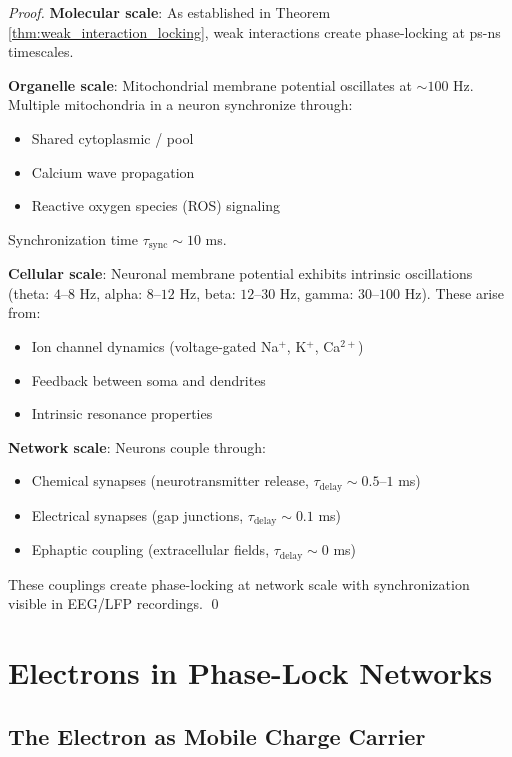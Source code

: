 \documentclass[11pt]{article}
\theoremstyle{remark}
\begin{document}
\begin{proof}
\textbf{Molecular scale}: As established in Theorem \ref{thm:weak_interaction_locking}, weak interactions create phase-locking at ps-ns timescales.

\textbf{Organelle scale}: Mitochondrial membrane potential oscillates at $\sim 100$ Hz. Multiple mitochondria in a neuron synchronize through:
\begin{itemize}
\item Shared cytoplasmic / pool
\item Calcium wave propagation
\item Reactive oxygen species (ROS) signaling
\end{itemize}
Synchronization time $\tau_{\text{sync}} \sim 10$ ms.

\textbf{Cellular scale}: Neuronal membrane potential exhibits intrinsic oscillations (theta: $4$--$8$ Hz, alpha: $8$--$12$ Hz, beta: $12$--$30$ Hz, gamma: $30$--$100$ Hz). These arise from:
\begin{itemize}
\item Ion channel dynamics (voltage-gated Na$^+$, K$^+$, Ca$^{2+}$)
\item Feedback between soma and dendrites
\item Intrinsic resonance properties
\end{itemize}

\textbf{Network scale}: Neurons couple through:
\begin{itemize}
\item Chemical synapses (neurotransmitter release, $\tau_{\text{delay}} \sim 0.5$--$1$ ms)
\item Electrical synapses (gap junctions, $\tau_{\text{delay}} \sim 0.1$ ms)
\item Ephaptic coupling (extracellular fields, $\tau_{\text{delay}} \sim 0$ ms)
\end{itemize}

These couplings create phase-locking at network scale with synchronization visible in EEG/LFP recordings. \qed
\end{proof}

\section{Electrons in Phase-Lock Networks}

\subsection{The Electron as Mobile Charge Carrier}
\end{document}
